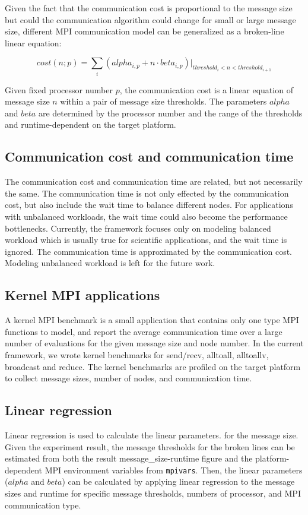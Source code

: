 Given the fact that the communication cost is proportional to the
message size but could the communication algorithm could change for
small or large message size, different MPI communication model can be
generalized as a broken-line linear equation:

\begin{equation}
cost(n;p) = \sum_i(alpha_{i,p} + n\cdot beta_{i,p})|_{threshold_i<n<threshold_{i+1}}
\end{equation}

Given fixed processor number $p$, the communication cost is a linear
equation of message size $n$ within a pair of message size thresholds.
The parameters $alpha$ and $beta$ are determined by the processor
number and the range of the thresholds and runtime-dependent on the
target platform.


\subsection{Communication cost and communication time}

The communication cost and communication time are related, but not
necessarily the same.  The communication time is not only effected by
the communication cost, but also include the wait time to balance
different nodes.  For applications with unbalanced workloads, the wait
time could also become the performance bottlenecks.  Currently, the
framework focuses only on modeling balanced workload which is usually
true for scientific applications, and the wait time is ignored.  The
communication time is approximated by the communication cost.
Modeling unbalanced workload is left for the future work.


\subsection{Kernel MPI applications}

A kernel MPI benchmark is a small application that contains only one
type MPI functions to model, and report the average communication time
over a large number of evaluations for the given message size and node
number.  In the current framework, we wrote kernel benchmarks for
send/recv, alltoall, alltoallv, broadcast and reduce.  The kernel
benchmarks are profiled on the target platform to collect message
sizes, number of nodes, and communication time.


\subsection{Linear regression}

Linear regression is used to calculate the linear parameters.  for the
message size.  Given the experiment result, the message thresholds for
the broken lines can be estimated from both the result
message\_size-runtime figure and the platform-dependent MPI
environment variables from \texttt{mpivars}.  Then, the linear
parameters ($alpha$ and $beta$) can be calculated by applying linear
regression to the message sizes and runtime for specific message
thresholds, numbers of processor, and MPI communication type.
